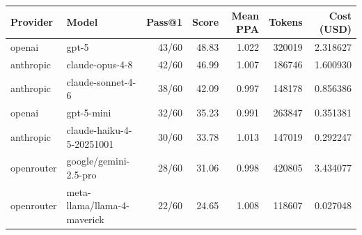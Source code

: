 \begin{tabular}{llrrrrr}
\toprule
Provider & Model & Pass@1 & Score & Mean PPA & Tokens & Cost (USD) \\
\midrule
openai & gpt-5 & 43/60 & 48.83 & 1.022 & 320019 & 2.318627 \\
anthropic & claude-opus-4-8 & 42/60 & 46.99 & 1.007 & 186746 & 1.600930 \\
anthropic & claude-sonnet-4-6 & 38/60 & 42.09 & 0.997 & 148178 & 0.856386 \\
openai & gpt-5-mini & 32/60 & 35.23 & 0.991 & 263847 & 0.351381 \\
anthropic & claude-haiku-4-5-20251001 & 30/60 & 33.78 & 1.013 & 147019 & 0.292247 \\
openrouter & google/gemini-2.5-pro & 28/60 & 31.06 & 0.998 & 420805 & 3.434077 \\
openrouter & meta-llama/llama-4-maverick & 22/60 & 24.65 & 1.008 & 118607 & 0.027048 \\
\bottomrule
\end{tabular}
